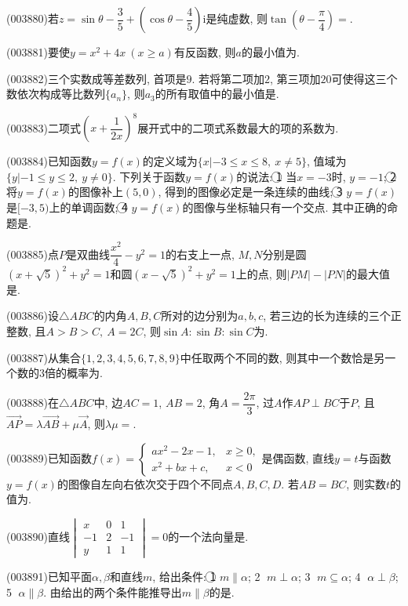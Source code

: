 \item (003880)若$z=\sin\theta-\dfrac 35+\left(\cos\theta-\dfrac 45\right)\mathrm{i}$是纯虚数, 则$\tan\left(\theta-\dfrac{\pi}{4}\right)=$.
\item (003881)要使$y=x^2+4x \ (x\ge a)$有反函数, 则$a$的最小值为.
\item (003882)三个实数成等差数列, 首项是$9$. 若将第二项加$2$, 第三项加$20$可使得这三个数依次构成等比数列$\{a_n\}$, 则$a_3$的所有取值中的最小值是.
\item (003883)二项式$\left(x+\dfrac 1{2x}\right)^8$展开式中的二项式系数最大的项的系数为.
\item (003884)已知函数$y=f(x)$的定义域为$\{x|-3\le x\le 8, \ x\ne 5\}$, 值域为$\{y|-1\le y\le 2, \ y\ne 0\}$. 下列关于函数$y=f(x)$的说法: \textcircled{1} 当$x=-3$时, $y=-1$; \textcircled{2} 将$y=f(x)$的图像补上$(5,0)$, 得到的图像必定是一条连续的曲线; \textcircled{3} $y=f(x)$是$[-3,5)$上的单调函数; \textcircled{4} $y=f(x)$的图像与坐标轴只有一个交点. 其中正确的命题是.
\item (003885)点$P$是双曲线$\dfrac{x^2}{4}-y^2=1$的右支上一点, $M,N$分别是圆$(x+\sqrt{5})^2+y^2=1$和圆$(x-\sqrt{5})^2+y^2=1$上的点, 则$|PM|-|PN|$的最大值是.
\item (003886)设$\triangle ABC$的内角$A,B,C$所对的边分别为$a,b,c$, 若三边的长为连续的三个正整数, 且$A>B>C, \ A=2C$, 则$\sin A:\sin B:\sin C$为.
\item (003887)从集合$\{1,2,3,4,5,6,7,8,9\}$中任取两个不同的数, 则其中一个数恰是另一个数的$3$倍的概率为.
\item (003888)在$\triangle ABC$中, 边$AC=1$, $AB=2$, 角$A=\dfrac{2\pi}{3}$, 过$A$作$AP\perp BC$于$P$, 且$\overrightarrow{AP}=\lambda \overrightarrow{AB}+\mu \overrightarrow{A}$, 则$\lambda\mu=$.
\item (003889)已知函数$f(x)=\begin{cases}ax^2-2x-1, & x\ge 0,\\ x^2+bx+c, & x<0\end{cases}$是偶函数, 直线$y=t$与函数$y=f(x)$的图像自左向右依次交于四个不同点$A,B,C,D$. 若$AB=BC$, 则实数$t$的值为.
\item (003890)直线$\begin{vmatrix}
x & 0 & 1\\-1 & 2 & -1\\y & 1 & 1
\end{vmatrix}=0$的一个法向量是.
\item (003891)已知平面$\alpha,\beta$和直线$m$, 给出条件: \textcircled{1} $m\parallel \alpha$; \textcircled{2} $m\perp \alpha$; \textcircled{3} $m\subseteq \alpha$; \textcircled{4} $\alpha\perp \beta$; \textcircled{5} $\alpha\parallel\beta$. 由给出的两个条件能推导出$m\parallel \beta$的是.
